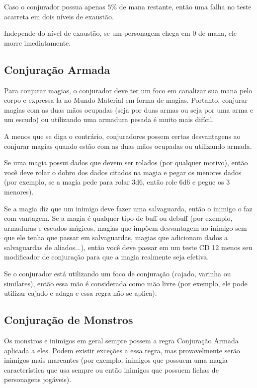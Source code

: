 \documentclass{RPG_Adventure}[2021/10/20]
\begin{document}
Caso o conjurador possua apenas $5\%$ de mana restante, então uma falha no teste
acarreta em dois níveis de exaustão.

Independe do nível de exaustão, se um personagem chega em $0$ de mana, ele
morre imediatamente.

\subsection*{Conjuração Armada}%
\label{sub:conjuracao_armada}

Para conjurar magias, o conjurador deve ter um foco em canalizar sua mana pelo
corpo e expressa-la no Mundo Material em forma de magias. Portanto, conjurar
magias com as duas mãos ocupadas (seja por duas armas ou seja por uma arma e um
escudo) ou utilizando uma armadura pesada é muito mais difícil.

A menos que se diga o contrário, conjuradores possem certas desvantagens ao
conjurar magias quando estão com as duas mãos ocupadas ou utilizando armada.

Se uma magia possui dados que devem ser rolados (por qualquer motivo), então você
deve rolar o dobro dos dados citados na magia e pegar os menores dados (por
exemplo, se a magia pede para rolar 3d6, então role 6d6 e pegue os 3 menores).

Se a magia diz que um inimigo deve fazer uma salvaguarda, então o inimigo o faz
com vantagem. Se a magia é qualquer tipo de buff ou debuff (por exemplo,
armaduras e escudos mágicos, magias que impõem desvantagem ao inimigo sem que ele
tenha que passar em salvaguardas, magias que adicionam dados a salvaguardas de
aliados...), então você deve passar em um teste CD 12 menos seu modificador de
conjuração para que a magia realmente seja efetiva.

Se o conjurador está utilizando um foco de conjuração (cajado, varinha ou
similares), então essa mão é considerada como mão livre (por exemplo, ele pode
utilizar cajado e adaga e essa regra não se aplica).

\subsection*{Conjuração de Monstros}%
\label{sub:conjuracao_de_monstros}

Os monstros e inimigos em geral sempre possem a regra Conjuração Armada aplicada
a eles. Podem existir exceções a essa regra, mas provavelmente serão inimigos
mais marcantes (por exemplo, inimigos que possuem uma magia característica que
usa sempre ou então inimigos que possuem fichas de personagens jogáveis).
\end{document}
